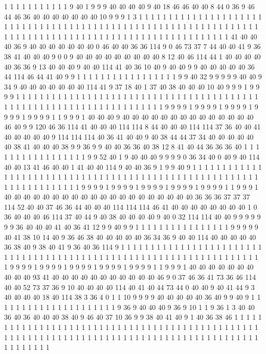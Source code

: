 1 1 1 1 1 1 1 1 1 1 1 9 40 1 9 9 9 40 40 40
40 9 40 18 46 46 40 40 8 44 0 36 9 46 44 46 36 40 40 40
40 40 40 40 10 9 9 9 1 3 1 1 1 1 1 1 1 1 1 1
1 1 1 1 1 1 1 1 1 1 1 1 1 1 1 1 1 1 1 1
1 1 1 1 1 1 1 1 1 1 1 1 1 1 1 1 1 1 1 1
1 1 1 1 1 1 1 1 1 1 1 1 1 1 1 1 1 1 1 1
1 1 1 1 1 1 1 1 1 1 1 1 1 1 1 1 1 1 1 1
1 1 1 1 1 1 1 1 1 1 1 1 41 40 40 40 36 9 40 40
40 40 40 40 40 0 46 40 40 36 36 114 9 0 46 73 37 7 44 40
40 41 9 36 38 41 40 40 40 9 0 0 9 40 40 40 40 40 40 40
40 40 8 12 40 46 114 44 1 40 40 40 40 40 36 36 9 13 40 40
40 9 40 40 114 41 40 36 10 40 9 40 40 9 9 40 40 40 40 40
36 44 114 46 44 41 40 9 9 1 1 1 1 1 1 1 1 1 1 1
1 1 1 1 1 1 9 9 40 32 9 9 9 9 9 40 40 9 34 9
40 40 40 40 40 40 40 114 41 9 37 18 40 1 37 40 38 40 40 40
10 40 9 9 9 1 9 9 9 9 1 1 1 1 1 1 1 1 1 1
1 1 1 1 1 1 1 1 1 1 1 1 1 1 1 1 1 1 1 1
1 1 1 1 1 1 1 1 1 1 1 1 1 1 1 1 1 1 1 1
1 1 1 1 1 1 1 1 1 1 1 1 1 1 1 1 1 1 9 9
9 9 1 9 9 9 9 1 9 9 9 9 1 9 9 9 9 1 9 9
9 9 1 1 9 9 9 1 40 40 40 9 40 40 40 40 40 40 40 40
40 40 40 40 40 40 46 40 9 9 120 46 36 114 41 40 40 40 114 114
8 44 40 40 40 114 114 37 36 40 40 41 40 40 40 40 40 9 114 114
114 40 36 41 40 40 9 40 38 44 44 37 34 40 40 40 40 40 40 38
41 40 40 40 38 9 9 36 9 9 40 40 36 36 40 38 12 8 41 40
44 36 36 36 40 1 1 1 1 1 1 1 1 1 1 1 1 1 1 1
1 1 9 9 52 40 1 9 40 40 40 9 9 9 9 0 36 34 40 0
40 9 40 114 40 40 13 41 46 40 40 1 41 40 40 114 9 40 40 36
9 1 9 9 40 9 1 1 1 1 1 1 1 1 1 1 1 1 1 1
1 1 1 1 1 1 1 1 1 1 1 1 1 1 1 1 1 1 1 1
1 1 1 1 1 1 1 1 1 1 1 1 1 1 1 1 1 1 1 1
1 1 1 1 1 1 1 1 1 1 1 1 1 1 9 9 9 9 1 9
9 9 9 1 9 9 9 9 1 9 9 9 9 1 9 9 9 9 1 1
9 9 9 1 40 40 40 40 40 40 40 40 40 40 40 40 40 40 40 40
40 40 40 40 36 36 36 37 37 37 114 52 40 40 37 46 36 44 40 40
40 114 114 114 46 41 40 40 40 40 40 40 40 40 1 0 36 40 40 40
46 114 37 40 44 9 40 38 40 40 40 40 9 40 0 32 114 114 40 40
9 9 9 9 9 9 9 36 40 40 40 41 40 36 41 12 9 9 40 9
9 1 1 1 1 1 1 1 1 1 1 1 1 1 1 1 1 9 9 9
9 9 40 41 38 10 14 40 9 36 46 38 40 40 40 40 40 36 34 36
9 40 40 114 40 40 40 40 40 36 38 40 9 38 40 41 9 36 40 36
114 9 1 1 1 1 1 1 1 1 1 1 1 1 1 1 1 1 1 1
1 1 1 1 1 1 1 1 1 1 1 1 1 1 1 1 1 1 1 1
1 1 1 1 1 1 1 1 1 1 1 1 1 1 1 1 1 1 1 1
1 1 1 1 1 1 1 1 1 1 9 9 9 9 1 9 9 9 9 1
9 9 9 9 1 9 9 9 9 1 9 9 9 9 1 1 9 9 9 1
40 40 40 40 40 40 40 40 40 40 93 41 40 40 40 40 40 40 40 40
40 40 40 46 9 0 37 46 36 41 73 36 46 114 40 40 52 73 37 36
9 10 40 40 40 40 114 40 41 40 44 73 44 0 40 40 9 40 41 44
9 3 40 40 40 40 18 40 114 38 3 36 4 0 1 1 10 9 9 9
9 40 40 40 40 40 36 40 9 9 40 9 1 1 1 1 1 1 1 1
1 1 1 1 1 1 1 1 1 1 1 1 1 9 36 9 40 40 40 9
36 9 10 1 1 9 36 1 3 40 40 36 40 36 40 40 40 38 40 9
46 40 37 10 36 9 9 38 40 41 40 9 1 40 36 38 46 1 1 1
1 1 1 1 1 1 1 1 1 1 1 1 1 1 1 1 1 1 1 1
1 1 1 1 1 1 1 1 1 1 1 1 1 1 1 1 1 1 1 1
1 1 1 1 1 1 1 1 1 1 1 1 1 1 1 1 1 1 1 1
1 1 1 1 1 1 1 1 1 1 1 1 1 1 1 1 1 1 1 1
1 1 1 1 1 1 1 1 1 1 1 1 1 1 1 1
